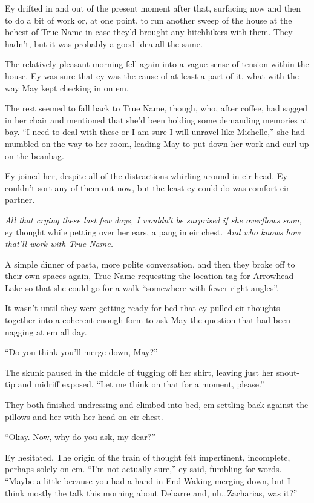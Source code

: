 Ey drifted in and out of the present moment after that, surfacing now and then to do a bit of work or, at one point, to run another sweep of the house at the behest of True Name in case they'd brought any hitchhikers with them. They hadn't, but it was probably a good idea all the same.

The relatively pleasant morning fell again into a vague sense of tension within the house. Ey was sure that ey was the cause of at least a part of it, what with the way May kept checking in on em.

The rest seemed to fall back to True Name, though, who, after coffee, had sagged in her chair and mentioned that she'd been holding some demanding memories at bay. ``I need to deal with these or I am sure I will unravel like Michelle,'' she had mumbled on the way to her room, leading May to put down her work and curl up on the beanbag.

Ey joined her, despite all of the distractions whirling around in eir head. Ey couldn't sort any of them out now, but the least ey could do was comfort eir partner.

\emph{All that crying these last few days, I wouldn't be surprised if she overflows soon,} ey thought while petting over her ears, a pang in eir chest. \emph{And who knows how that'll work with True Name.}

A simple dinner of pasta, more polite conversation, and then they broke off to their own spaces again, True Name requesting the location tag for Arrowhead Lake so that she could go for a walk ``somewhere with fewer right-angles''.

It wasn't until they were getting ready for bed that ey pulled eir thoughts together into a coherent enough form to ask May the question that had been nagging at em all day.

``Do you think you'll merge down, May?''

The skunk paused in the middle of tugging off her shirt, leaving just her snout-tip and midriff exposed. ``Let me think on that for a moment, please.''

They both finished undressing and climbed into bed, em settling back against the pillows and her with her head on eir chest.

``Okay. Now, why do you ask, my dear?''

Ey hesitated. The origin of the train of thought felt impertinent, incomplete, perhaps solely on em. ``I'm not actually sure,'' ey said, fumbling for words. ``Maybe a little because you had a hand in End Waking merging down, but I think mostly the talk this morning about Debarre and, uh\ldots Zacharias, was it?''

